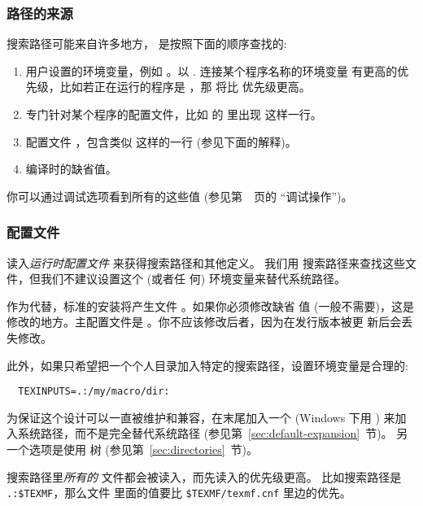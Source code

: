 \documentclass{article}
\begin{document}
\subsubsection{路径的来源}
\label{sec:path-sources}

搜索路径可能来自许多地方，\KPS{} 是按照下面的顺序查找的: 

\begin{enumerate}
\item
  用户设置的环境变量，例如 \@。以 . 连接某个程序名称的环境变量
  有更高的优先级，比如若正在运行的程序是 ，那 
  将比  优先级更高。
\item
  专门针对某个程序的配置文件，比如  的  里出现
   这样一行。
\item   \KPS{} 配置文件 ，包含类似
   这样的一行 (参见下面的解释)。
\item 编译时的缺省值。
\end{enumerate}
\noindent 你可以通过调试选项看到所有的这些值 (参见第~\pageref{sec:debugging}~页的
``调试操作'')。

\subsubsection{配置文件}
\label{sec:configfiles}

\KPS{} 读入\emph{运行时配置文件}  来获得搜索路径和其他定义。
我们用  搜索路径来查找这些文件，但我们不建议设置这个 (或者任
何) 环境变量来替代系统路径。

作为代替，标准的安装将产生文件 。如果你必须修改缺省
值 (一般不需要)，这是修改的地方。主配置文件是
。你不应该修改后者，因为在发行版本被更
新后会丢失修改。

此外，如果只希望把一个个人目录加入特定的搜索路径，设置环境变量是合理的: 
\begin{verbatim}
  TEXINPUTS=.:/my/macro/dir:
\end{verbatim}
为保证这个设计可以一直被维护和兼容，在末尾加入一个 \samp{:} (Windows 下用 \samp{;})
来加入系统路径，而不是完全替代系统路径 (参见第~\ref{sec:default-expansion}~节)。
另一个选项是使用  树 (参见第~\ref{sec:directories}~节)。

搜索路径里\emph{所有的}  文件都会被读入，而先读入的优先级更高。
比如搜索路径是 \verb|.:$TEXMF|，那么文件  里面的值要比
\verb|$TEXMF/texmf.cnf| 里边的优先。
\end{document}
